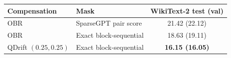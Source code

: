 \begin{tabular}{llc}
\toprule
Compensation & Mask & WikiText-2 test (val) \\
\midrule
OBR & SparseGPT pair score & 21.42 (22.12) \\
OBR & Exact block-sequential & 18.63 (19.11) \\
QDrift $(0.25,0.25)$ & Exact block-sequential & \textbf{16.15 (16.05)} \\
\bottomrule
\end{tabular}
